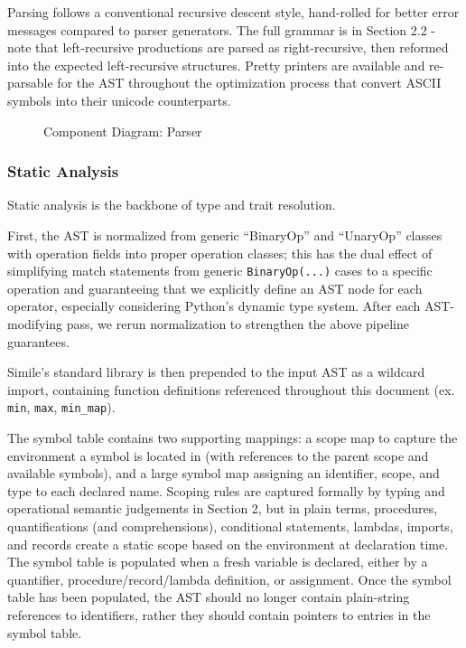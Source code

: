 Parsing follows a conventional recursive descent style, hand-rolled for better error messages compared to parser generators. The full grammar is in Section 2.2 - note that left-recursive productions are parsed as right-recursive, then reformed into the expected left-recursive structures. Pretty printers are available and re-parsable for the AST throughout the optimization process that convert ASCII symbols into their unicode counterparts.
\begin{figure}[H]
  \centering
  \caption{Component Diagram: Parser}
  \label{fig:componentParser}
\end{figure}

\subsubsection{Static Analysis}
Static analysis is the backbone of type and trait resolution.

First, the AST is normalized from generic ``BinaryOp'' and ``UnaryOp'' classes with operation fields into proper operation classes; this has the dual effect of simplifying match statements from generic \texttt{BinaryOp(...)} cases to a specific operation and guaranteeing that we explicitly define an AST node for each operator, especially considering Python's dynamic type system. After each AST-modifying pass, we rerun normalization to strengthen the above pipeline guarantees.

Simile's standard library is then prepended to the input AST as a wildcard import, containing function definitions referenced throughout this document (ex. \texttt{min}, \texttt{max}, \texttt{min_map}).

The symbol table contains two supporting mappings: a scope map to capture the environment a symbol is located in (with references to the parent scope and available symbols), and a large symbol map assigning an identifier, scope, and type to each declared name. Scoping rules are captured formally by typing and operational semantic judgements in Section 2, but in plain terms, procedures, quantifications (and comprehensions), conditional statements, lambdas, imports, and records create a static scope based on the environment at declaration time. The symbol table is populated when a fresh variable is declared, either by a quantifier, procedure/record/lambda definition, or assignment. Once the symbol table has been populated, the AST should no longer contain plain-string references to identifiers, rather they should contain pointers to entries in the symbol table.


